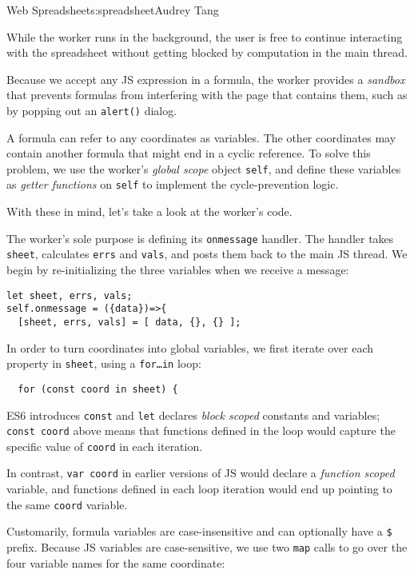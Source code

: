 \begin{aosachapter}{Web Spreadsheet}{s:spreadsheet}{Audrey Tang}
\begin{aosaitemize}
\item
  While the worker runs in the background, the user is free to continue
  interacting with the spreadsheet without getting blocked by
  computation in the main thread.
\item
  Because we accept any JS expression in a formula, the worker provides
  a \emph{sandbox} that prevents formulas from interfering with the page
  that contains them, such as by popping out an \texttt{alert()} dialog.
\item
  A formula can refer to any coordinates as variables. The other
  coordinates may contain another formula that might end in a cyclic
  reference. To solve this problem, we use the worker's \emph{global
  scope} object \texttt{self}, and define these variables as
  \emph{getter functions} on \texttt{self} to implement the
  cycle-prevention logic.
\end{aosaitemize}

With these in mind, let's take a look at the worker's code.

The worker's sole purpose is defining its \texttt{onmessage} handler.
The handler takes \texttt{sheet}, calculates \texttt{errs} and
\texttt{vals}, and posts them back to the main JS thread. We begin by
re-initializing the three variables when we receive a message:

\begin{verbatim}
let sheet, errs, vals;
self.onmessage = ({data})=>{
  [sheet, errs, vals] = [ data, {}, {} ];
\end{verbatim}

In order to turn coordinates into global variables, we first iterate
over each property in \texttt{sheet}, using a \texttt{for\ldots{}in}
loop:

\begin{verbatim}
  for (const coord in sheet) {
\end{verbatim}

ES6 introduces \texttt{const} and \texttt{let} declares \emph{block
scoped} constants and variables; \texttt{const coord} above means that
functions defined in the loop would capture the specific value of
\texttt{coord} in each iteration.

In contrast, \texttt{var coord} in earlier versions of JS would declare
a \emph{function scoped} variable, and functions defined in each loop
iteration would end up pointing to the same \texttt{coord} variable.

Customarily, formula variables are case-insensitive and can optionally
have a \texttt{\$} prefix. Because JS variables are case-sensitive, we
use two \texttt{map} calls to go over the four variable names for the
same coordinate:


\end{aosachapter}

